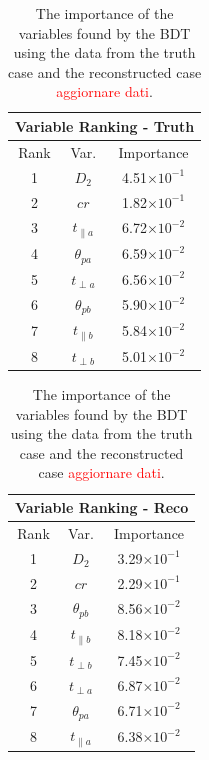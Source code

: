 \documentclass[10pt,a4paper]{book}
\newcommand\todo[1]{\textcolor{red}{#1}}
\begin{document}
\begin{table}
    \begin{minipage}{.5\linewidth}
      \centering
        \begin{tabular}{|c|c|c|}
	\hline 
	\multicolumn{3}{|c|}{Variable Ranking - Truth} \\ 
	\hline 
	Rank & Var. & Importance \\ 
	\hline 
	1 & $D_2$ & 4.51$\times 10^{-1}$ \\ 
	\hline 
	2 & $cr$ & 1.82$\times 10^{-1}$ \\ 
	\hline 
	3 & $t_{\parallel a}$ & 6.72$\times 10^{-2}$ \\ 
	\hline 
	4 & $\theta_{pa}$ & 6.59$\times 10^{-2}$ \\ 
	\hline 
	5 & $t_{\perp a}$ & 6.56$\times 10^{-2}$ \\ 
	\hline 
	6 & $\theta_{pb}$  & 5.90$\times 10^{-2}$ \\ 
	\hline 
	7 & $t_{\parallel b}$ & 5.84$\times 10^{-2}$ \\ 
	\hline 
	8 & $t_{\perp b}$& 5.01$\times 10^{-2}$ \\ 
	\hline 
	\end{tabular} 
    \end{minipage}%
    \begin{minipage}{.5\linewidth}
      \centering
        \begin{tabular}{|c|c|c|}
	\hline 
	\multicolumn{3}{|c|}{Variable Ranking - Reco} \\ 
	\hline 
	Rank & Var. & Importance \\ 
	\hline 
	1 & $D_2$ & 3.29$\times 10^{-1}$ \\ 
	\hline 
	2 & $cr$ & 2.29$\times 10^{-1}$ \\ 
	\hline 
	3 & $\theta_{pb}$ & 8.56$\times 10^{-2}$ \\ 
	\hline 
	4 & $t_{\parallel b}$ & 8.18$\times 10^{-2}$ \\ 
	\hline 
	5 & $t_{\perp b}$ & 7.45$\times 10^{-2}$ \\ 
	\hline 
	6 & $t_{\perp a}$  & 6.87$\times 10^{-2}$ \\ 
	\hline 
	7 & $\theta_{pa}$ & 6.71$\times 10^{-2}$ \\ 
	\hline 
	8 & $t_{\parallel a}$ & 6.38$\times 10^{-2}$ \\ 
	\hline 
	\end{tabular}  
    \end{minipage} 
    \caption{The importance of the variables found by the BDT using the data from the truth case and the reconstructed case \todo{aggiornare dati}.}
    \label{variable ranking}
\end{table}
\end{document}
